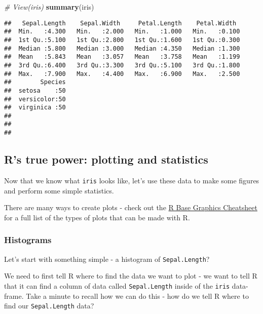 \documentclass[]{article}
\newenvironment{Shaded}{\begin{snugshade}}{\end{snugshade}}
\newcommand{\KeywordTok}[1]{\textcolor[rgb]{0.13,0.29,0.53}{\textbf{#1}}}
\newcommand{\CommentTok}[1]{\textcolor[rgb]{0.56,0.35,0.01}{\textit{#1}}}
\newcommand{\OperatorTok}[1]{\textcolor[rgb]{0.81,0.36,0.00}{\textbf{#1}}}
\newcommand{\NormalTok}[1]{#1}
\begin{document}
\begin{Shaded}
\begin{Highlighting}[]
\CommentTok{# View(iris)}
\KeywordTok{summary}\NormalTok{(iris)}
\end{Highlighting}
\end{Shaded}

\begin{verbatim}
##   Sepal.Length    Sepal.Width     Petal.Length    Petal.Width   
##  Min.   :4.300   Min.   :2.000   Min.   :1.000   Min.   :0.100  
##  1st Qu.:5.100   1st Qu.:2.800   1st Qu.:1.600   1st Qu.:0.300  
##  Median :5.800   Median :3.000   Median :4.350   Median :1.300  
##  Mean   :5.843   Mean   :3.057   Mean   :3.758   Mean   :1.199  
##  3rd Qu.:6.400   3rd Qu.:3.300   3rd Qu.:5.100   3rd Qu.:1.800  
##  Max.   :7.900   Max.   :4.400   Max.   :6.900   Max.   :2.500  
##        Species  
##  setosa    :50  
##  versicolor:50  
##  virginica :50  
##                 
##                 
## 
\end{verbatim}

\subsection{R's true power: plotting and
statistics}\label{rs-true-power-plotting-and-statistics}

Now that we know what \texttt{iris} looks like, let's use these data to
make some figures and perform some simple statistics.

There are many ways to create plots - check out the
\href{http://publish.illinois.edu/johnrgallagher/files/2015/10/BaseGraphicsCheatsheet.pdf}{R
Base Graphics Cheatsheet} for a full list of the types of plots that can
be made with R.

\subsubsection{Histograms}\label{histograms}

Let's start with something simple - a histogram of
\texttt{Sepal.Length}?

We need to first tell R where to find the data we want to plot - we want
to tell R that it can find a column of data called \texttt{Sepal.Length}
inside of the \texttt{iris} data-frame. Take a minute to recall how we
can do this - how do we tell R where to find our \texttt{Sepal.Length}
data?

\begin{Shaded}
\end{Shaded}
\end{document}
